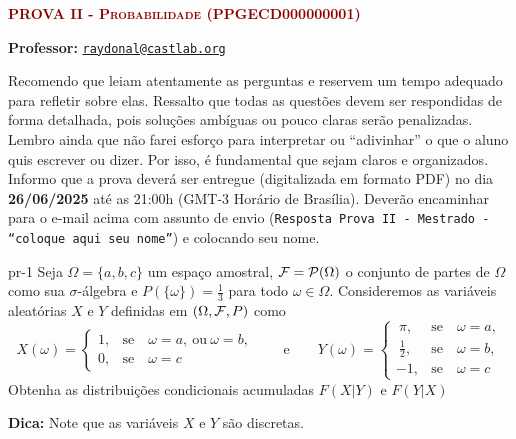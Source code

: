 



\usepackage{booktabs}
\usepackage{diagbox}

% 


{\scshape\bf\textcolor{darkred}{PROVA II - Probabilidade (PPGECD000000001)}}


\textsf{\textbf{Professor:}}    \href{mailto:raydonal@castlab.org}{\texttt{raydonal@castlab.org}}

\bigskip 
\begin{regras}
Recomendo que leiam atentamente as perguntas e reservem um tempo adequado para refletir sobre elas. Ressalto que todas as questões devem ser respondidas de forma detalhada, pois soluções ambíguas ou pouco claras serão penalizadas. Lembro ainda que não farei esforço para interpretar ou ``adivinhar'' o que o aluno quis escrever ou dizer. Por isso, é fundamental que sejam claros e organizados. Informo que a prova deverá ser entregue (digitalizada em formato PDF) no dia {\bf 26/06/2025} até as 21:00h (GMT-3 Horário de Brasília). Deverão encaminhar para o e-mail acima com assunto de envio ({\tt Resposta Prova II - Mestrado - ``coloque aqui seu  nome''})  e colocando seu nome.
\end{regras}
\vspace{2ex}


\begin{problema}{}{pr-1}
	Seja $\Omega = \{a, b, c\}$  um espaço amostral, ${\cal F}={\cal P}(\Omega)$ o conjunto de partes de $\Omega$ como sua $\sigma$-álgebra e $P(\{\omega\})=\frac{1}{3}$ para todo $\omega \in \Omega.$ Consideremos as variáveis aleatórias $X$ e $Y$ definidas em $(\Omega, {\cal F}, P)$ como
	$$
	X(\omega) =
	\begin{cases}
		1, &  \text{se}  \quad  \omega=a, \ \text{ou} \ \omega = b,  \\
		0, &  \text{se}  \quad  \omega=c
	\end{cases} 
	\qquad \text{e} \qquad 
	Y(\omega) =
	\begin{cases}
		\ \pi, &  \text{se}  \quad  \omega=a, \\
		\ \frac{1}{2}, &  \text{se}  \quad  \omega=b, \\
		-1, &  \text{se}  \quad  \omega=c
	\end{cases} 
	$$
	Obtenha as distribuições condicionais acumuladas $F(X|Y)$ e $F(Y|X)$  
	
	{\bf Dica:}  Note que as variáveis $X$ e $Y$ são discretas.
	
\end{problema}


